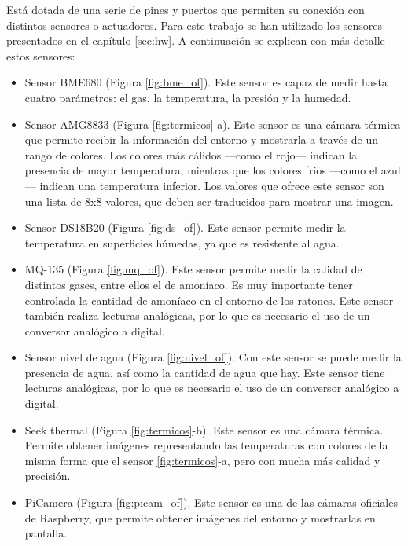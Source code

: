 Está dotada de una serie de pines y puertos que permiten su conexión con distintos sensores o actuadores. Para este trabajo se han utilizado los sensores presentados en el capítulo \ref{sec:hw}. A continuación se explican con más detalle estos sensores:
\begin{itemize}
\item{Sensor BME680 (Figura \ref{fig:bme_of}).} Este sensor es capaz de medir hasta cuatro parámetros: el gas, la temperatura, la presión y la humedad.

\item{Sensor AMG8833 (Figura \ref{fig:termicos}-a).} Este sensor es una cámara térmica que permite recibir la información del entorno y mostrarla a través de un rango de colores. Los colores más cálidos ---como el rojo--- indican la presencia de mayor temperatura, mientras que los colores fríos ---como el azul--- indican una temperatura inferior. Los valores que ofrece este sensor son una lista de 8x8 valores, que deben ser traducidos para mostrar una imagen.

\item{Sensor DS18B20 (Figura \ref{fig:ds_of}).} Este sensor permite medir la temperatura en superficies húmedas, ya que es resistente al agua.

\item{MQ-135 (Figura \ref{fig:mq_of}).} Este sensor permite medir la calidad de distintos gases, entre ellos el de amoníaco. Es muy importante tener controlada la cantidad de amoníaco en el entorno de los ratones. Este sensor también realiza lecturas analógicas, por lo que es necesario el uso de un conversor analógico a digital.

\item{Sensor nivel de agua (Figura \ref{fig:nivel_of}).} Con este sensor se puede medir la presencia de agua, así como la cantidad de agua que hay. Este sensor tiene lecturas analógicas, por lo que es necesario el uso de un conversor analógico a digital.

\item{Seek thermal (Figura \ref{fig:termicos}-b).} Este sensor es una cámara térmica. Permite obtener imágenes representando las temperaturas con colores de la misma forma que el sensor \ref{fig:termicos}-a, pero con mucha más calidad y precisión.

\item{PiCamera (Figura \ref{fig:picam_of}).} Este sensor es una de las cámaras oficiales de Raspberry, que permite obtener imágenes del entorno y mostrarlas en pantalla.
\end{itemize}


